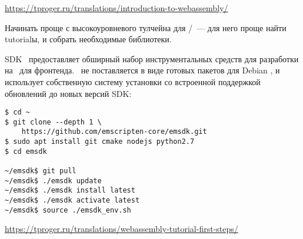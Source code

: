 \secdown

\noindent
\url{https://tproger.ru/translations/introduction-to-webassembly/}

\bigskip
Начинать проще с высокоуровневого тулчейна для \emc/\cpp\ --- для него проще
найти tutorialы, и собрать необходимые библиотеки. 


\noindent
SDK \ems\ предоставляет обширный набор инструментальных средств для разработки
на \cpp\ для фронтенда. \ems\ не поставляется в виде готовых пакетов для Debian
\linux, и использует собственную систему установки со встроенной поддержкой
обновлений до новых версий SDK:
\begin{lstlisting}
$ cd ~
$ git clone --depth 1 \
	https://github.com/emscripten-core/emsdk.git
$ sudo apt install git cmake nodejs python2.7
$ cd emsdk

~/emsdk$ git pull
~/emsdk$ ./emsdk update
~/emsdk$ ./emsdk install latest
~/emsdk$ ./emsdk activate latest
~/emsdk$ source ./emsdk_env.sh
\end{lstlisting}


\noindent
\url{https://tproger.ru/translations/webassembly-tutorial-first-steps/}

\bigskip
{}

\secup
